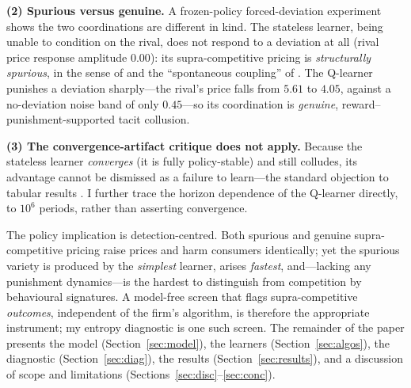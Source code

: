 \documentclass[11pt]{article}
\begin{document}
\textbf{(2) Spurious versus genuine.} A frozen-policy forced-deviation experiment shows the two
coordinations are different in kind. The stateless learner, being unable to condition on the rival, does
not respond to a deviation at all (rival price response amplitude $0.00$): its supra-competitive pricing is
\emph{structurally spurious}, in the sense of \citet{calvano2023genuine} and the ``spontaneous coupling'' of
\citet{banchiomantegazza2023}. The Q-learner punishes a deviation sharply---the rival's price falls from
$5.61$ to $4.05$, against a no-deviation noise band of only $0.45$---so its coordination is \emph{genuine},
reward--punishment-supported tacit collusion.

\textbf{(3) The convergence-artifact critique does not apply.} Because the stateless learner
\emph{converges} (it is fully policy-stable) and still colludes, its advantage cannot be dismissed as a
failure to learn---the standard objection to tabular results
\citep{denboermeylahnschinkel2024,abada2024collusion}. I further trace the horizon dependence of the
Q-learner directly, to $10^6$ periods, rather than asserting convergence.

The policy implication is detection-centred. Both spurious and genuine supra-competitive pricing raise
prices and harm consumers identically; yet the spurious variety is produced by the
\emph{simplest} learner, arises \emph{fastest}, and---lacking any punishment dynamics---is the hardest to
distinguish from competition by behavioural signatures. A model-free screen that flags supra-competitive
\emph{outcomes}, independent of the firm's algorithm, is therefore the appropriate instrument; my entropy
diagnostic is one such screen. The remainder of the paper presents the model (Section~\ref{sec:model}), the
learners (Section~\ref{sec:algos}), the diagnostic (Section~\ref{sec:diag}), the results
(Section~\ref{sec:results}), and a discussion of scope and limitations (Sections~\ref{sec:disc}--\ref{sec:conc}).
\end{document}
